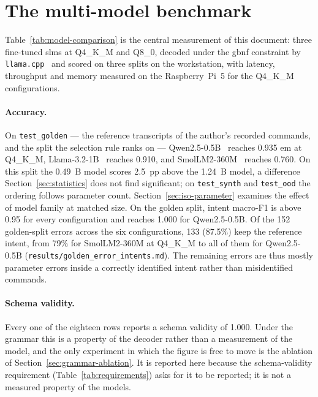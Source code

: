 \clearpage
\section{The multi-model benchmark}
\label{sec:benchmark}

Table~\ref{tab:model-comparison} is the central measurement of this document: three fine-tuned
\glspl{slm} at Q4\_K\_M and Q8\_0, decoded under the \gls{gbnf} constraint by
\texttt{llama.cpp}~\cite{llamacpp} and scored on three splits on the workstation, with latency,
throughput and memory measured on the Raspberry~Pi~5 for the Q4\_K\_M configurations.



\paragraph{Accuracy.} On \texttt{test\_golden} --- the reference transcripts of the author's
recorded commands, and the split the selection rule ranks on --- Qwen2.5-0.5B~\cite{qwen25} reaches
0.935 \gls{em} at Q4\_K\_M, Llama-3.2-1B~\cite{llama32} reaches 0.910, and
SmolLM2-360M~\cite{smollm2} reaches 0.760. On this split the 0.49~B model scores 2.5~pp above the
1.24~B model, a difference Section~\ref{sec:statistics} does not find significant; on
\texttt{test\_synth} and \texttt{test\_ood} the ordering follows parameter count.
Section~\ref{sec:iso-parameter} examines the effect of model family at matched size. On the golden
split, intent macro-F1 is above 0.95 for every configuration and reaches 1.000 for Qwen2.5-0.5B. Of
the 152 golden-split errors across the six configurations, 133 (87.5\%) keep the reference intent,
from 79\% for SmolLM2-360M at Q4\_K\_M to all of them for Qwen2.5-0.5B
(\texttt{results/golden\_error\_intents.md}). The remaining errors are thus mostly parameter
errors inside a correctly identified intent rather than misidentified commands.

\paragraph{Schema validity.} Every one of the eighteen rows reports a schema validity of 1.000.
Under the grammar this is a property of the decoder rather than a measurement of the model, and the
only experiment in which the figure is free to move is the ablation of
Section~\ref{sec:grammar-ablation}. It is reported here because the schema-validity requirement
(Table~\ref{tab:requirements}) asks for it to be reported; it is not a measured property of the
models.


